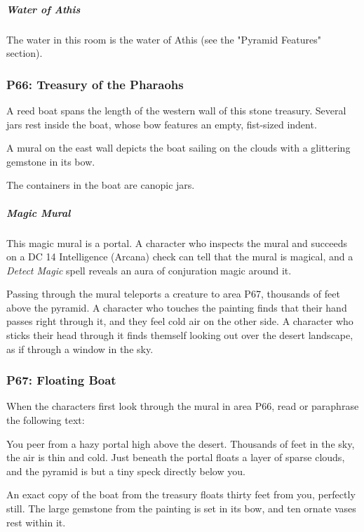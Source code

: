 \documentclass[10pt,a4paper,twoside,bg=print,twocolumn,openany,nodeprecatedcode]{dndbook}
\begin{document}
\subparagraph{Water of Athis}
The water in this room is the water of Athis (see the "Pyramid Features" section).

\subsubsection{P66: Treasury of the Pharaohs}
\begin{DndReadAloud}{}
A reed boat spans the length of the western wall of this stone treasury. Several jars rest inside the boat, whose bow features an empty, fist-sized indent.

A mural on the east wall depicts the boat sailing on the clouds with a glittering gemstone in its bow.

\end{DndReadAloud}

The containers in the boat are canopic jars.

\subparagraph{Magic Mural}
This magic mural is a portal. A character who inspects the mural and succeeds on a DC 14 Intelligence (Arcana) check can tell that the mural is magical, and a \textit{Detect Magic} spell reveals an aura of conjuration magic around it.

Passing through the mural teleports a creature to area P67, thousands of feet above the pyramid. A character who touches the painting finds that their hand passes right through it, and they feel cold air on the other side. A character who sticks their head through it finds themself looking out over the desert landscape, as if through a window in the sky.

\subsubsection{P67: Floating Boat}
When the characters first look through the mural in area P66, read or paraphrase the following text:

\begin{DndReadAloud}{}
You peer from a hazy portal high above the desert. Thousands of feet in the sky, the air is thin and cold. Just beneath the portal floats a layer of sparse clouds, and the pyramid is but a tiny speck directly below you.

An exact copy of the boat from the treasury floats thirty feet from you, perfectly still. The large gemstone from the painting is set in its bow, and ten ornate vases rest within it.

\end{DndReadAloud}
\end{document}
